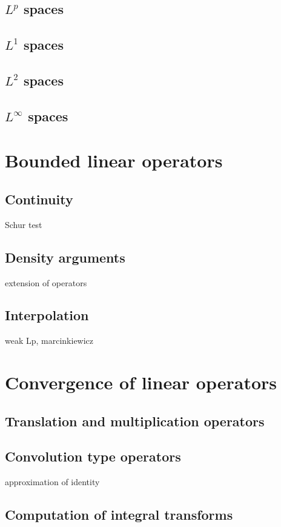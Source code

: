 \documentclass{../note}
\begin{document}
\section{$L^p$ spaces}
\section{$L^1$ spaces}
\section{$L^2$ spaces}
\section{$L^\infty$ spaces}








\chapter{Bounded linear operators}
\section{Continuity}
Schur test

\section{Density arguments}
extension of operators

\section{Interpolation}
weak Lp, marcinkiewicz




\chapter{Convergence of linear operators}
\section{Translation and multiplication operators}

\section{Convolution type operators}
approximation of identity

\section{Computation of integral transforms}
\end{document}
